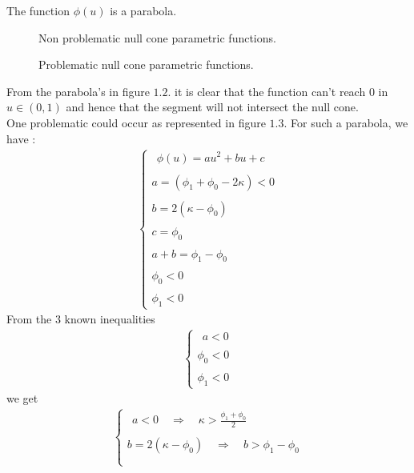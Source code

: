 The function $\phi(u)$ is a parabola. 
\begin{figure}[H]%
    \centering
    \subfloat[]{}
	\qquad
    \subfloat[]{}
    \qquad
    \subfloat[]{}
\caption{Non problematic null cone parametric functions.}
\label{fig:fig_p126_1a}
\end{figure}
\begin{figure}[H]%
    \centering
    \subfloat[]{}
\caption{Problematic null cone parametric functions.}
\label{fig:fig_p126_1b}
\end{figure}From the parabola's in figure $1.2.$ it is clear that the function can't reach $0$ in $u\in(0,1)$  and hence that the segment will not intersect the null cone.\\
One problematic could occur as represented in figure $1.3$.
For such a parabola, we have :
\begin{align}
\left\{\begin{array}{l} \ \ 
\phi(u)= au^2+bu+c\\\\
a = \left(\phi_1 +\phi_0-2\kappa\right) <0\\\\
b=2 \left(\kappa- \phi_0\right)\\\\
c=\phi_0\\\\
a+b=\phi_1-\phi_0\\\\
\phi_0<0\\\\
\phi_1 < 0
\end{array}\right.
\end{align}
From the $3$ known inequalities 
\begin{align}
\left\{\begin{array}{l} \ \ 
a < 0\\\\
\phi_0<0\\\\
\phi_1 < 0
\end{array}\right.
\end{align}
we get
\begin{align}
\left\{\begin{array}{l} \ \ 
a < 0\quad\Rightarrow\quad \kappa > \frac{\phi_1+\phi_0}{2} \\\\ b=2 \left(\kappa- \phi_0\right)\quad \Rightarrow\quad b > \phi_1-\phi_0\\\\
\end{array}\right.
\end{align}
